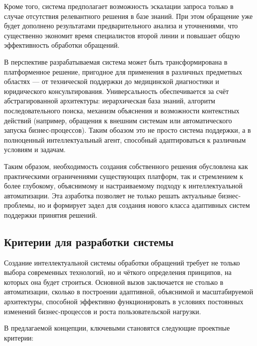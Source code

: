Кроме того, система предполагает возможность эскалации запроса только в случае отсутствия релевантного решения в базе знаний. При этом обращение уже будет дополнено результатами предварительного анализа и уточнениями, что существенно экономит время специалистов второй линии и повышает общую эффективность обработки обращений.

В перспективе разрабатываемая система может быть трансформирована в платформенное решение, пригодное для применения в различных предметных областях — от технической поддержки до медицинской диагностики и юридического консультирования. Универсальность обеспечивается за счёт абстрагированной архитектуры: иерархическая база знаний, алгоритм последовательного поиска, механизм объяснения и возможности контекстных действий (например, обращения к внешним системам или автоматического запуска бизнес-процессов). Таким обоазом это не просто система поддержки, а в полноценный интеллектуальный агент, способный адаптироваться к различным условиям и задачам.

Таким образом, необходимость создания собственного решения обусловлена как практическими ограничениями существующих платформ, так и стремлением к более глубокому, объяснимому и настраиваемому подходу к интеллектуальной автоматизации. Эта азработка позволяет не только решать актуальные бизнес-проблемы, но и формирует задел для создания нового класса адаптивных систем поддержки принятия решений.

\subsection{Критерии для разработки системы}

Создание интеллектуальной системы обработки обращений требует не только выбора современных технологий, но и чёткого определения принципов, на которых она будет строиться. Основной вызов заключается не столько в автоматизации, сколько в построении адаптивной, объяснимой и масштабируемой архитектуры, способной эффективно функционировать в условиях постоянных изменений бизнес-процессов и роста пользовательской нагрузки.

В предлагаемой концепции, ключевыми становятся следующие проектные критерии:

